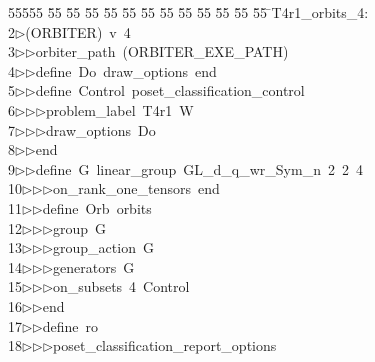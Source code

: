 %
%
\begin{tabbing}
55555 \= 55 \= 55 \= 55 \= 55 \= 55 \= 55 \= 55 \= 55 \= 55 \= 55 \= 55 \= 55 \= \>T4r1\_orbits\_4:\\[0pt]
2\>$\triangleright$\>(ORBITER)\ v\ 4\ \\[0pt]
3\>$\triangleright$\>$\triangleright$\>orbiter\_path\ (ORBITER\_EXE\_PATH)\ \\[0pt]
4\>$\triangleright$\>$\triangleright$\>define\ Do\ draw\_options\ end\ \\[0pt]
5\>$\triangleright$\>$\triangleright$\>define\ Control\ poset\_classification\_control\ \\[0pt]
6\>$\triangleright$\>$\triangleright$\>$\triangleright$\>problem\_label\ T4r1\ W\ \\[0pt]
7\>$\triangleright$\>$\triangleright$\>$\triangleright$\>draw\_options\ Do\ \\[0pt]
8\>$\triangleright$\>$\triangleright$\>end\ \\[0pt]
9\>$\triangleright$\>$\triangleright$\>define\ G\ linear\_group\ GL\_d\_q\_wr\_Sym\_n\ 2\ 2\ 4\ \\[0pt]
10\>$\triangleright$\>$\triangleright$\>$\triangleright$\>on\_rank\_one\_tensors\ end\ \\[0pt]
11\>$\triangleright$\>$\triangleright$\>define\ Orb\ orbits\ \\[0pt]
12\>$\triangleright$\>$\triangleright$\>$\triangleright$\>group\ G\ \\[0pt]
13\>$\triangleright$\>$\triangleright$\>$\triangleright$\>group\_action\ G\ \\[0pt]
14\>$\triangleright$\>$\triangleright$\>$\triangleright$\>generators\ G\ \\[0pt]
15\>$\triangleright$\>$\triangleright$\>$\triangleright$\>on\_subsets\ 4\ Control\ \\[0pt]
16\>$\triangleright$\>$\triangleright$\>end\ \\[0pt]
17\>$\triangleright$\>$\triangleright$\>define\ ro\ \\[0pt]
18\>$\triangleright$\>$\triangleright$\>$\triangleright$\>poset\_classification\_report\_options\ \\[0pt]

\end{tabbing}
